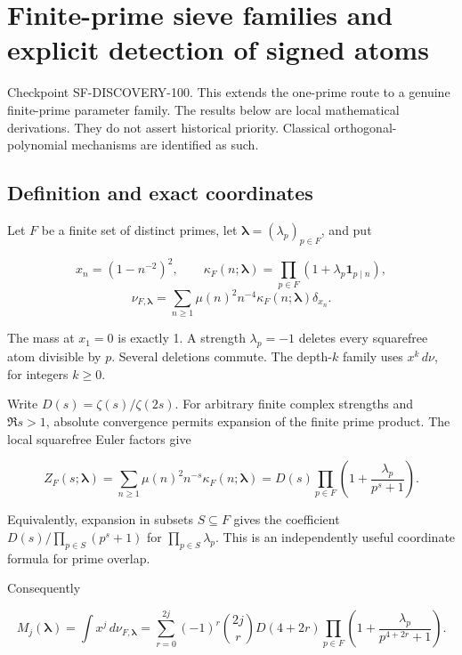 \hypertarget{finite-prime-sieve-families-and-explicit-detection-of-signed-atoms}{%
\section{Finite-prime sieve families and explicit detection of signed
atoms}\label{finite-prime-sieve-families-and-explicit-detection-of-signed-atoms}}

Checkpoint SF-DISCOVERY-100. This extends the one-prime route to a
genuine finite-prime parameter family. The results below are local
mathematical derivations. They do not assert historical priority.
Classical orthogonal-polynomial mechanisms are identified as such.

\hypertarget{definition-and-exact-coordinates}{%
\subsection{Definition and exact
coordinates}\label{definition-and-exact-coordinates}}

Let \(F\) be a finite set of distinct primes, let
\(\boldsymbol\lambda=(\lambda_p)_{p\in F}\), and put

\[
x_n=(1-n^{-2})^2,\qquad
\kappa_F(n;\boldsymbol\lambda)=\prod_{p\in F}(1+\lambda_p\mathbf1_{p\mid n}),
\] \[
\nu_{F,\boldsymbol\lambda}
=\sum_{n\ge1}\mu(n)^2n^{-4}\kappa_F(n;\boldsymbol\lambda)\delta_{x_n}.
\]

The mass at \(x_1=0\) is exactly 1. A strength \(\lambda_p=-1\) deletes
every squarefree atom divisible by \(p\). Several deletions commute. The
depth-\(k\) family uses \(x^k\,d\nu\), for integers \(k\ge0\).

Write \(D(s)=\zeta(s)/\zeta(2s)\). For arbitrary finite complex
strengths and \(\Re s>1\), absolute convergence permits expansion of the
finite prime product. The local squarefree Euler factors give

\[
Z_F(s;\boldsymbol\lambda)
=\sum_{n\ge1}\mu(n)^2n^{-s}\kappa_F(n;\boldsymbol\lambda)
=D(s)\prod_{p\in F}\left(1+\frac{\lambda_p}{p^s+1}\right).
\]

Equivalently, expansion in subsets \(S\subseteq F\) gives the
coefficient \(D(s)/\prod_{p\in S}(p^s+1)\) for
\(\prod_{p\in S}\lambda_p\). This is an independently useful coordinate
formula for prime overlap.

Consequently

\[
M_j(\boldsymbol\lambda)=\int x^j\,d\nu_{F,\boldsymbol\lambda}
=\sum_{r=0}^{2j}(-1)^r\binom{2j}{r}
 D(4+2r)\prod_{p\in F}
 \left(1+\frac{\lambda_p}{p^{4+2r}+1}\right).
\tag{1}
\]

